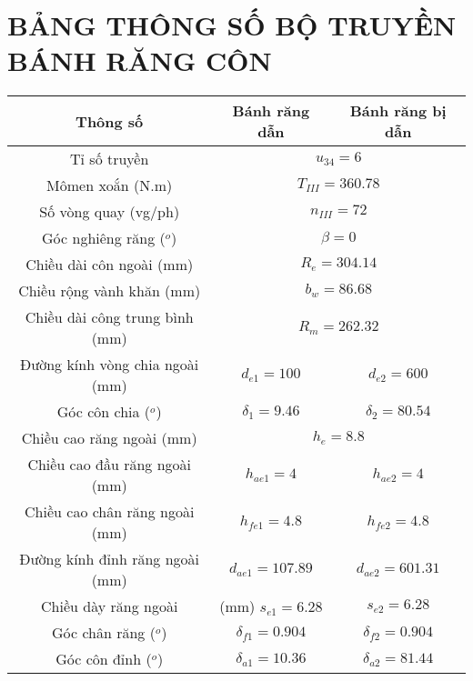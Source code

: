     \section{BẢNG THÔNG SỐ BỘ TRUYỀN BÁNH RĂNG CÔN}
        \begin{table}[H]
            \centering
            \begin{tabular}{|c|c|c|}
                \hline
                \textbf{Thông số} & \textbf{Bánh răng dẫn} & \textbf{Bánh răng bị dẫn} \\ \hline
                Tỉ số truyền & \multicolumn{2}{c|}{$u_{34} = 6$} \\ \hline
                Mômen xoắn (N.m) & \multicolumn{2}{c|}{$T_{III} = 360.78$} \\ \hline
                Số vòng quay (vg/ph) & \multicolumn{2}{c|}{$n_{III} = 72$} \\ \hline
                Góc nghiêng răng ($^o$) & \multicolumn{2}{c|}{$\beta = 0$} \\ \hline
                Chiều dài côn ngoài (mm) & \multicolumn{2}{c|}{$R_e = 304.14$} \\ \hline
                Chiều rộng vành khăn (mm) & \multicolumn{2}{c|}{$b_w = 86.68$} \\ \hline
                Chiều dài công trung bình (mm) & \multicolumn{2}{c|}{$R_m = 262.32$} \\ \hline
                Đường kính vòng chia ngoài (mm) & $d_{e1} = 100$ &  $d_{e2} = 600$ \\ \hline
                Góc côn chia ($^o$) & $\delta_1 = 9.46$ & $\delta_2 = 80.54$ \\ \hline
                Chiều cao răng ngoài (mm) & \multicolumn{2}{c|}{$h_e  = 8.8$} \\ \hline
                Chiều cao đầu răng ngoài (mm) & $h_{ae1}  = 4$ & $h_{ae2}  = 4$ \\ \hline
                Chiều cao chân răng ngoài (mm) & $h_{fe1}  = 4.8$ & $h_{fe2}  = 4.8  $ \\ \hline
                Đường kính đỉnh răng ngoài (mm) & $d_{ae1} = 107.89$ & $d_{ae2} = 601.31$ \\ \hline
                Chiều dày răng ngoài & (mm) $s_{e1} = 6.28$ & $s_{e2} = 6.28$ \\ \hline
                Góc chân răng ($^o$) & $\delta_{f1} = 0.904$ & $\delta_{f2} = 0.904$ \\ \hline
                Góc côn đỉnh ($^o$) & $\delta_ {a1} = 10.36$ & $\delta_ {a2} = 81.44$ \\ \hline

\end{tabular}
\end{table}

